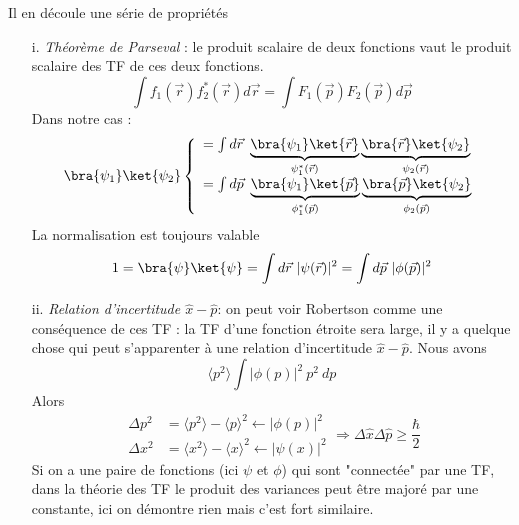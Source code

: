 	
	Il en découle une série de propriétés
	\begin{itemize}
	\item[i.] \textit{Théorème de Parseval }: le produit scalaire de deux fonctions vaut le produit 
	scalaire des TF de ces deux fonctions. 
		\begin{equation}
	\int f_1(\vec{r})f_2^*(\vec{r}) d\vec{r} = \int F_1(\vec{p})F_2(\vec{p})d\vec{p}
	\end{equation}
	Dans notre cas :
	\begin{equation}
	\bra{\psi_1}\ket{\psi_2} \left\{\begin{array}{ll}
		= \int d\vec{r}\ \underbrace{\bra{\psi_1}\ket{\vec{r}}}_{\psi_1^*(\vec{r})}
	\underbrace{\bra{\vec{r}}\ket{\psi_2}}_{\psi_2(\vec{r})}\\
	= \int d\vec{p}\ \underbrace{\bra{\psi_1}\ket{\vec{p}}}_{\phi_1^*(\vec{p})}
	\underbrace{\bra{\vec{p}}\ket{\psi_2}}_{\phi_2(\vec{p})}		
	\end{array}\right.
	\end{equation}
		La normalisation est toujours valable
	\begin{equation}
	1 = \bra{\psi}\ket{\psi} = \int d\vec{r}\ |\psi(\vec{r})|^2 = \int d\vec{p}\ |\phi(\vec{p})|^2
	\end{equation}
	
	\item[ii.] \textit{Relation d'incertitude $\hat{x}-\hat{p}$}: on peut voir Robertson comme une 
	conséquence de ces TF : la TF d'une fonction étroite sera large, il y a quelque chose qui peut
	 s'apparenter à une relation d'incertitude $\hat x-\hat p$. Nous avons
	 \begin{equation}
	 \langle p^2\rangle \int |\phi(p)|^2\ p^2\ dp
	 \end{equation}
	Alors
	\begin{equation}
	\begin{array}{ll}
	\Delta p^2 &= \langle p^2 \rangle-\langle p\rangle^2 \longleftarrow |\phi(p)|^2\\
	\Delta x^2 &= \langle x^2 \rangle-\langle x\rangle^2 \longleftarrow |\psi(x)|^2
	\end{array}\Longrightarrow \Delta \hat x\Delta\hat{p} \geq\frac{\hbar}{2}
	\end{equation}
	Si on a une paire de fonctions (ici $\psi$ et $\phi$) qui sont "connectée" par une TF, dans la 
	théorie des TF le produit des variances peut être majoré par une constante, ici on démontre 
	rien mais c'est fort similaire.
		

\end{itemize}
